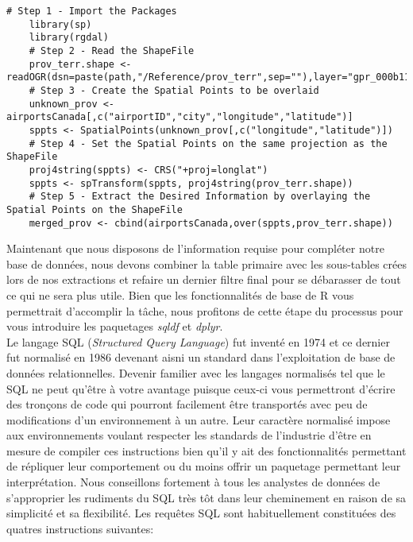 \begin{lstlisting}[caption = Procédé standard pour le traitement de données géospatiales en R,label=src:GeoDataR]
	# Step 1 - Import the Packages	
	library(sp)
	library(rgdal)
	# Step 2 - Read the ShapeFile
	prov_terr.shape <- readOGR(dsn=paste(path,"/Reference/prov_terr",sep=""),layer="gpr_000b11a_e")
	# Step 3 - Create the Spatial Points to be overlaid
	unknown_prov <- airportsCanada[,c("airportID","city","longitude","latitude")]
	sppts <- SpatialPoints(unknown_prov[,c("longitude","latitude")])
	# Step 4 - Set the Spatial Points on the same projection as the ShapeFile
	proj4string(sppts) <- CRS("+proj=longlat")
	sppts <- spTransform(sppts, proj4string(prov_terr.shape))
	# Step 5 - Extract the Desired Information by overlaying the Spatial Points on the ShapeFile
	merged_prov <- cbind(airportsCanada,over(sppts,prov_terr.shape))
\end{lstlisting}

\vspace{\baselineskip}
\noindent
Maintenant que nous disposons de l'information requise pour compléter notre base de données, nous devons combiner la table primaire avec les sous-tables crées lors de nos extractions et refaire un dernier filtre final pour se débarasser de tout ce qui ne sera plus utile. Bien que les fonctionnalités de base de R vous permettrait d'accomplir la tâche, nous profitons de cette étape du processus pour vous introduire les paquetages \emph{sqldf} et \emph{dplyr}. \\

\noindent
Le langage SQL (\emph{Structured Query Language}) fut inventé en 1974 et ce dernier fut normalisé en 1986 devenant aisni un standard dans l'exploitation de base de données relationnelles. Devenir familier avec les langages normalisés tel que le SQL ne peut qu'être à votre avantage puisque ceux-ci vous permettront d'écrire des tronçons de code qui pourront facilement être transportés avec peu de modifications d'un environnement à un autre. Leur caractère normalisé impose aux environnements voulant respecter les standards de l'industrie d'être en mesure de compiler ces instructions bien qu'il y ait des fonctionnalités permettant de répliquer leur comportement ou du moins offrir un paquetage permettant leur interprétation. \cite{SQL} Nous conseillons fortement à tous les analystes de données de s'approprier les rudiments du SQL très tôt dans leur cheminement en raison de sa simplicité et sa flexibilité. Les requêtes SQL sont habituellement constituées des quatres instructions suivantes: \\

